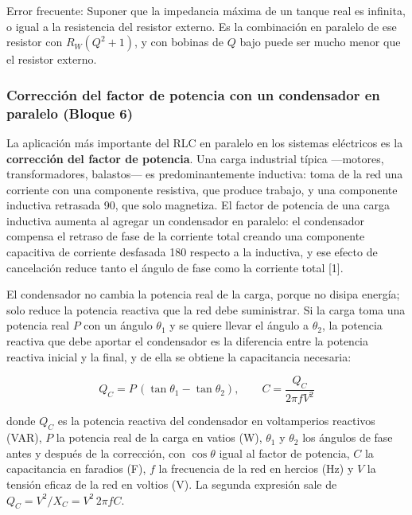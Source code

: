 \documentclass[11pt,letterpaper]{article}
\begin{document}
\begin{nota}{Error frecuente:}
Suponer que la impedancia máxima de un tanque real es infinita, o igual a la resistencia del resistor externo. Es la combinación en paralelo de ese resistor con $R_W(Q^2 + 1)$, y con bobinas de $Q$ bajo puede ser mucho menor que el resistor externo.
\end{nota}

\subsubsection{Corrección del factor de potencia con un condensador en paralelo (Bloque 6)}

La aplicación más importante del RLC en paralelo en los sistemas eléctricos es la \textbf{corrección del factor de potencia}. Una carga industrial típica ---motores, transformadores, balastos--- es predominantemente inductiva: toma de la red una corriente con una componente resistiva, que produce trabajo, y una componente inductiva retrasada 90\textdegree{}, que solo magnetiza. El factor de potencia de una carga inductiva aumenta al agregar un condensador en paralelo: el condensador compensa el retraso de fase de la corriente total creando una componente capacitiva de corriente desfasada 180\textdegree{} respecto a la inductiva, y ese efecto de cancelación reduce tanto el ángulo de fase como la corriente total [1].

El condensador no cambia la potencia real de la carga, porque no disipa energía; solo reduce la potencia reactiva que la red debe suministrar. Si la carga toma una potencia real $P$ con un ángulo $\theta_1$ y se quiere llevar el ángulo a $\theta_2$, la potencia reactiva que debe aportar el condensador es la diferencia entre la potencia reactiva inicial y la final, y de ella se obtiene la capacitancia necesaria:

\begin{equation}
  Q_C = P\,(\tan\theta_1 - \tan\theta_2), \qquad C = \frac{Q_C}{2\pi f V^{2}}
\end{equation}

donde $Q_C$ es la potencia reactiva del condensador en voltamperios reactivos (VAR), $P$ la potencia real de la carga en vatios (W), $\theta_1$ y $\theta_2$ los ángulos de fase antes y después de la corrección, con $\cos\theta$ igual al factor de potencia, $C$ la capacitancia en faradios (F), $f$ la frecuencia de la red en hercios (Hz) y $V$ la tensión eficaz de la red en voltios (V). La segunda expresión sale de $Q_C = V^2/X_C = V^2 \, 2\pi f C$.
\end{document}
